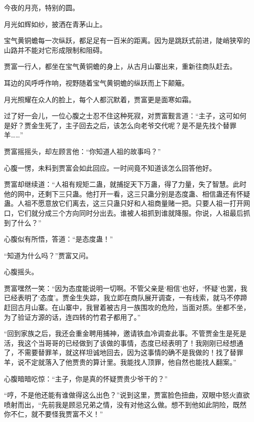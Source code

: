 
\begin{this_body}



今夜的月亮，特别的圆。

月光如辉如纱，披洒在青茅山上。

宝气黄铜蟾每一次纵跃，都足足有一百米的距离。因为是跳跃式前进，陡峭狭窄的山路并不能对它形成限制和阻碍。

贾富一行人，都坐在宝气黄铜蟾的身上，从古月山寨出来，重新往商队赶去。

耳边的风呼呼作响，视野随着宝气黄铜蟾的纵跃而上下颠簸。

月光照耀在众人的脸上，每个人都沉默着，贾富更是面寒如霜。

过了好一会儿，一位心腹之士忍不住这种死寂，对贾富觐言道：“主子，这可如何是好？贾金生死了，主子回去之后，该怎么向老爷交代呢？是不是先找个替罪羊……”

贾富摇摇头，却左顾言他：“你知道人祖的故事吗？”

心腹一愣，未料到贾富会如此回应。一时间竟不知道该怎么回答他好。

贾富却继续道：“人祖有规矩二蛊，就捕捉天下万蛊，得了力量，失了智慧。此时他的网中，还剩下三只蛊。他打开一看，这三只蛊分别是态度蛊、相信蛊还有怀疑蛊。人祖不愿意放它们离去，这三只蛊只好和人祖商量赌一把。只要人祖一打开网口，它们就分成三个方向同时分出去。谁被人祖抓到谁就降服。你说，人祖最后抓到了什么？”

心腹似有所悟，答道：“是态度蛊！”

“知道为什么吗？”贾富又问。

心腹摇头。

贾富嘿然一笑：“因为态度能说明一切啊。不管父亲是‘相信’也好，‘怀疑’也罢，我已经表明了‘态度’。贾金生失踪，我立即在商队展开调查，一有线索，就马不停蹄赶回古月山寨。在山寨中，我冒着被古月一族围攻的危险，当面对质。坐都不坐，为了验证方源的话，连四转的竹君子都用了。”

“回到家族之后，我还会重金聘用捕神，邀请铁血冷调查此事。不管贾金生是死是活，我这个当哥哥的已经做到了该做的事情，态度已经表明了！我刚刚已经想通了，不需要替罪羊，就这样坦诚地回去，因为这事情的确不是我做的！找了替罪羊，说不定就落入了他贾贵的算计里。我能找人顶罪，他自然也能找人翻案。”

心腹暗暗吃惊：“主子，你是真的怀疑贾贵少爷干的？”

“哼，不是他还能有谁做得这么出色？”说到这里，贾富脸色扭曲，双眼中怒火直欲喷射而出，“先前我是顾忌兄弟之情，没有对他这么做。想不到他如此阴险，既然你不仁，就不要怪我贾富不义！”


\end{this_body}
